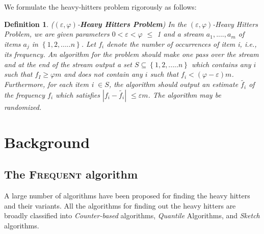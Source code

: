 \documentclass{article}
\newcommand{\ignore}[1]{}
\newcommand{\eps}{\varepsilon}
\renewcommand{\phi}{\varphi}
\newtheorem{definition}{Definition}
\begin{document}
\begin{multicols}{2}
We formulate the heavy-hitters problem rigorously as follows:
\begin{definition}
 ($(\varepsilon, \varphi)$-\textbf {Heavy Hitters Problem})
    In the $(\varepsilon, \varphi)$-Heavy Hitters Problem, we are given
    parameters $0< \varepsilon <\varphi$ $\leqslant$ 1 and a stream $a_{1},....,a_{m}$
    of items $a_{j}$ in $\left\{1,2,.....n\right\}$. Let $f_{i}$ denote the number of
    occurrences of item i, i.e., its frequency. An algorithm for the problem should make one pass over the stream and at the end
    of the stream output a set $S \subseteq \left\{1,2,.....n\right\}$ which contains any $i$ such that $f_I \geq \phi m$ and does not contain any $i$ such that $f_i < (\phi - \eps)m$.
 Furthermore, for each item i $\in S$, the algorithm should output an estimate $\tilde{f_{i}}$ of the frequency $f_{i}$ which satisfies $|f_{i} -\tilde{f_{i}}|$ $ \leqslant \varepsilon m$. The algorithm may be randomized.
\end{definition}
    
\ignore{
    \section{Motivation}
    The frequent items problem is to process a stream of items and find all items occurring more than a given fraction of the time. It is one of the most heavily studied problems in data stream mining, dating back to the 1980s. Many applications rely directly or indirectly on finding the frequent items, and implementations are in use in large scale industrial systems.The problem is popular due to its simplicity to state, and its intuitive interest and value. It is important both in itself, and as a subroutine within more advanced data stream computations. Informally, given a sequence of items, the problem is simply to find those items which occur most frequently. Applications of data streams include data warehousing, network measurements, sensor networks, and compressed sensing.
   }
    
    \section{Background}
\subsection{The \textsc{Frequent} algorithm}
    A large number of algorithms have been proposed for finding the heavy hitters and their variants. All the algorithms for finding out the heavy hitters are broadly classified into {\em Counter-based} algorithms, {\em Quantile} Algorithms,  and {\em Sketch} algorithms. 


\end{multicols}
\end{document}
